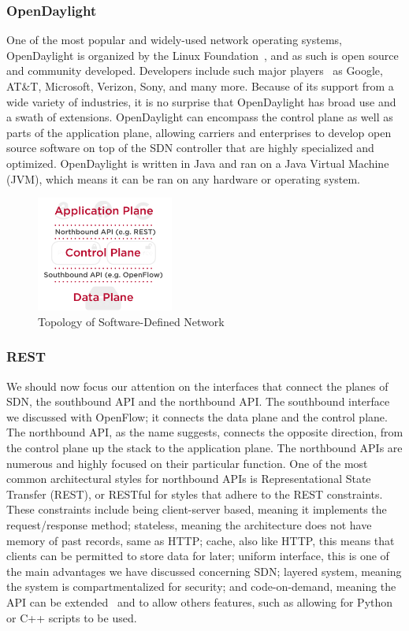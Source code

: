\documentclass[11pt]{article}
\begin{document}
\subsubsection{OpenDaylight}

One of the most popular and widely-used network operating systems, OpenDaylight is organized by the Linux Foundation~\cite{Reza}, and as such is open source and community developed. Developers include such major players~\cite{Daylight} as Google, AT\&T, Microsoft, Verizon, Sony, and many more. Because of its support from a wide variety of industries, it is no surprise that OpenDaylight has broad use and a swath of extensions. OpenDaylight can encompass the control plane as well as parts of the application plane, allowing carriers and enterprises to develop open source software on top of the SDN controller that are highly specialized and optimized. OpenDaylight is written in Java and ran on a Java Virtual Machine (JVM), which means it can be ran on any hardware or operating system.

\begin{figure}
	\centering
	\includegraphics[width=0.4\textwidth]{Topology}
	\caption[]{Topology of Software-Defined Network}
\end{figure}

\subsubsection{REST}

We should now focus our attention on the interfaces that connect the planes of SDN,  the southbound API and the northbound API. The southbound interface we discussed with OpenFlow; it connects the data plane and the control plane. The northbound API, as the name suggests, connects the opposite direction, from the control plane up the stack to the application plane. The northbound APIs are numerous and highly focused on their particular function. One of the most common architectural styles for northbound APIs is Representational State Transfer (REST), or RESTful for styles that adhere to the REST constraints. These constraints include being client-server based, meaning it implements the request/response method; stateless, meaning the architecture does not have memory of past records, same as HTTP; cache, also like HTTP, this means that clients can be permitted to store data for later; uniform interface, this is one of the main advantages we have discussed concerning SDN; layered system, meaning the system is compartmentalized for security; and code-on-demand, meaning the API can be extended~\cite{Morreale} and to allow others features, such as allowing for Python or C++ scripts to be used.
\end{document}
